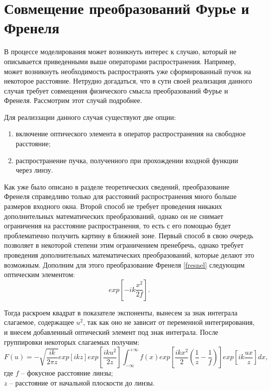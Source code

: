 	\newpage
	\section{Совмещение преобразований Фурье и Френеля}{
	В процессе моделирования может возникнуть интерес к случаю, который не описывается приведенными выше операторами распространения. Например, может возникнуть необходимость распространять уже сформированный пучок на некоторое расстояние. Нетрудно догадаться, что в сути своей реализация данного случая требует совмещения физического смысла преобразований Фурье и Френеля. Рассмотрим этот случай подробнее.

	 Для реализзации данного случая существуют две опции:
	\begin{enumerate}[\arabic*)] 
	\item включение оптического элемента в оператор распространения на свободное расстояние;
	\item распространение пучка, полученного при прохождении входной функции через линзу.
	\end{enumerate}
	\vspace{0.2cm}
	Как уже было описано в разделе теоретических сведений, преобразование Френеля справедливо только для расстояний распространения много больше размеров входного окна. Второй способ не требует проведения никаких дополнительных математических преобразований, однако он не снимает ограничения на расстояние распространения, то есть с его помощью будет проблематично получить картину в ближней зоне. Первый способ в свою очередь позволяет в некоторой степени этим ограничением пренебречь, однако требует проведения дополнительных математических преобразований, которые делают это возможным. Дополним для этого преобразование Френеля \eqref{fresnel} следующим оптическим элементом:
	\begin{equation*}
	exp[-ik \frac{x^2}{2f} ].
	\end{equation*}
	
	Тогда раскроем квадрат в показателе экспоненты, вынесем за знак интеграла слагаемое, содержащее $u^2$, так как оно не зависит от переменной интегрирования, и внесем добавленный оптический элемент под знак интеграла. После группировки некоторых слагаемых получим:
	\begin{equation*}
	F(u) = - \sqrt{\frac{ik}{2 \pi z}}exp[ikz] exp[{ \frac{iku^2}{2z} }] \int_{-\infty}^{+\infty}f(x) exp[\frac{ikx^2}{2}( \frac{1}{z} - \frac{1}{f})] exp[{ik \frac{ux}{z}}]dx,
	\end{equation*}
	\tab где $f$ -- фокусное расстояние линзы;\\
	\tab \tab \hspace{-0.4cm}$z$ -- расстояние от начальной плоскости до  линзы.
	
}
